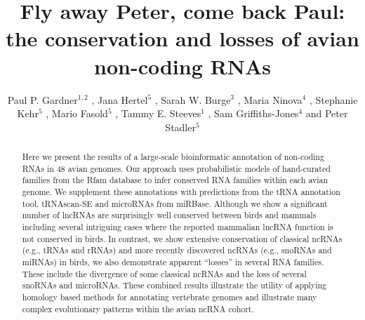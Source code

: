 \documentclass[10pt]{bmc_article}
\newenvironment{bmcformat}{\begin{raggedright}\baselineskip20pt\sloppy\setboolean{publ}{false}}{\end{raggedright}\baselineskip20pt\sloppy}
\begin{document}
\begin{bmcformat}

\title{Fly away Peter, come back Paul: the conservation and losses of avian non-coding RNAs}

\author{
Paul P. Gardner\correspondingauthor$^{1,2}$
,
Jana Hertel$^5$
,
Sarah W. Burge$^3$
,
Maria Ninova$^4$
,
Stephanie Kehr$^5$
,
Mario Fasold$^5$
,
Tammy E. Steeves$^1$
,
Sam Griffiths-Jones$^4$
and
Peter Stadler\correspondingauthor$^5$
}
\address{
\iid(1) School of Biological Sciences, University of Canterbury, Private Bag 4800, Christchurch, New Zealand.
\iid(2) Biomolecular Interaction Centre, University of Canterbury, Private Bag 4800, Christchurch, New Zealand.
\iid(3) European Molecular Biology Laboratory, European Bioinformatics Institute, Hinxton, Cambridge, CB10 1SD, UK.
\iid(4) Faculty of Life Sciences, University of Manchester, Manchester, United Kingdom.
\iid(5) Bioinformatics Group, Department of Computer Science; and Interdisciplinary Center for Bioinformatics, University of Leipzig, H{\"a}rtelstrasse 16-18, D-04107 Leipzig, Germany
}

\maketitle

\begin{abstract}
Here we present the results of a large-scale bioinformatic annotation
of non-coding RNAs in 48 avian genomes. Our approach uses
probabilistic models of hand-curated families from the Rfam database
to infer conserved RNA families within each avian genome. We
supplement these annotations with predictions from the tRNA annotation
tool, tRNAscan-SE and microRNAs from miRBase.  Although we show a
significant number of lncRNAs are surprisingly well conserved between
birds and mammals including several intriguing cases where the
reported mammalian lncRNA function is not conserved in birds.  In
contrast, we show extensive conservation of classical ncRNAs (e.g.,
tRNAs and rRNAs) and more recently discovered ncRNAs (e.g., snoRNAs
and miRNAs) in birds, we also demonstrate apparent ``losses'' in
several RNA families. These include the divergence of some classical
ncRNAs and the loss of several snoRNAs and microRNAs.  These combined
results illustrate the utility of applying homology based methods for
annotating vertebrate genomes and illustrate many complex evolutionary
patterns within the avian ncRNA cohort.
\end{abstract}


\end{bmcformat}
\end{document}
